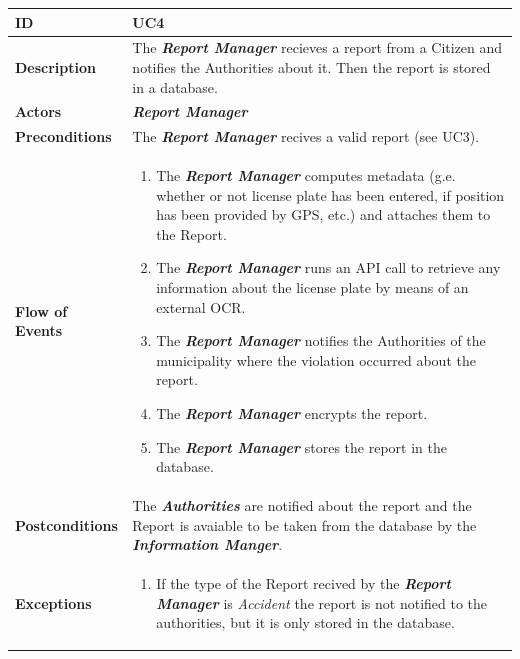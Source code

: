 \documentclass{report}
\begin{document}
\begin{tabularx}{\linewidth}{| l | X |}
	\hline
	\textbf{ID} & UC4\\
	
	\hline
	\textbf{Description} & The \textbf{\textit{Report Manager}} recieves a report from a Citizen and notifies the Authorities about it. Then the report is stored in a database.\\
	
	\hline
	\textbf{Actors} & \textbf{\textit{Report Manager}}\\
	
	\hline
	\textbf{Preconditions} & The \textbf{\textit{Report Manager}} recives a valid report (see UC3).\\
	
	\hline
	\textbf{Flow of Events} & \parbox{0.7\textwidth}{\begin{enumerate}
			\item The \textbf{\textit{Report Manager}} computes metadata (g.e. whether or not license plate has been entered, if position has been provided by GPS, etc.) and attaches them to the Report.
			\item The \textbf{\textit{Report Manager}} runs an API call to retrieve any information about the license plate by means of an external OCR.
			\item The \textbf{\textit{Report Manager}} notifies the Authorities of the municipality where the violation occurred about the report.
			\item The \textbf{\textit{Report Manager}} encrypts the report.	
			\item The \textbf{\textit{Report Manager}} stores the report in the database.
			
	\end{enumerate}}\\
	
	\hline
	\textbf{Postconditions} & The \textbf{\textit{Authorities}} are notified about the report and the Report is avaiable to be taken from the database by the \textbf{\textit{Information Manger}}.\\
	
	\hline
	\textbf{Exceptions} & \parbox{0.7\textwidth}{ \begin{enumerate}
			\item If the type of the Report recived by the \textbf{\textit{Report Manager}} is \textit{Accident} the report is not notified to the authorities, but it is only stored in the database. 
		\end{enumerate}}\\
	
	\hline
	
\end{tabularx}
\end{document}
